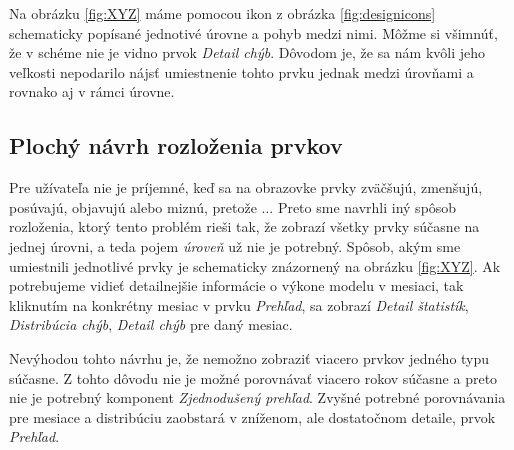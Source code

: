 Na obrázku \ref{fig:XYZ} máme pomocou ikon z obrázka \ref{fig:designicons} schematicky popísané jednotivé úrovne a pohyb medzi nimi. Môžme si všimnúť, že v schéme nie je vidno prvok \textit{Detail chýb}. Dôvodom je, že sa nám kvôli jeho veľkosti nepodarilo nájsť umiestnenie tohto prvku jednak medzi úrovňami a rovnako aj v rámci úrovne.

\subsection{Plochý návrh rozloženia prvkov}
Pre užívateľa nie je príjemné, keď sa na obrazovke prvky zväčšujú, zmenšujú, posúvajú, objavujú alebo miznú, pretože ... %
Preto sme navrhli iný spôsob rozloženia, ktorý tento problém rieši tak, že zobrazí všetky prvky súčasne na jednej úrovni, a teda pojem \textit{úroveň} už nie je potrebný. Spôsob, akým sme umiestnili jednotlivé prvky je schematicky znázornený na obrázku \ref{fig:XYZ}. Ak potrebujeme vidieť detailnejšie informácie o výkone modelu v mesiaci, tak kliknutím na konkrétny mesiac v prvku \textit{Prehľad}, sa zobrazí \textit{Detail štatistík}, \textit{Distribúcia chýb}, \textit{Detail chýb} pre daný mesiac.

Nevýhodou tohto návrhu je, že nemožno zobraziť viacero prvkov jedného typu súčasne. Z tohto dôvodu nie je možné porovnávať viacero rokov súčasne a preto nie je potrebný komponent \textit{Zjednodušený prehľad}. Zvyšné potrebné porovnávania pre mesiace a distribúciu zaobstará v zníženom, ale dostatočnom detaile, prvok \textit{Prehľad}. 